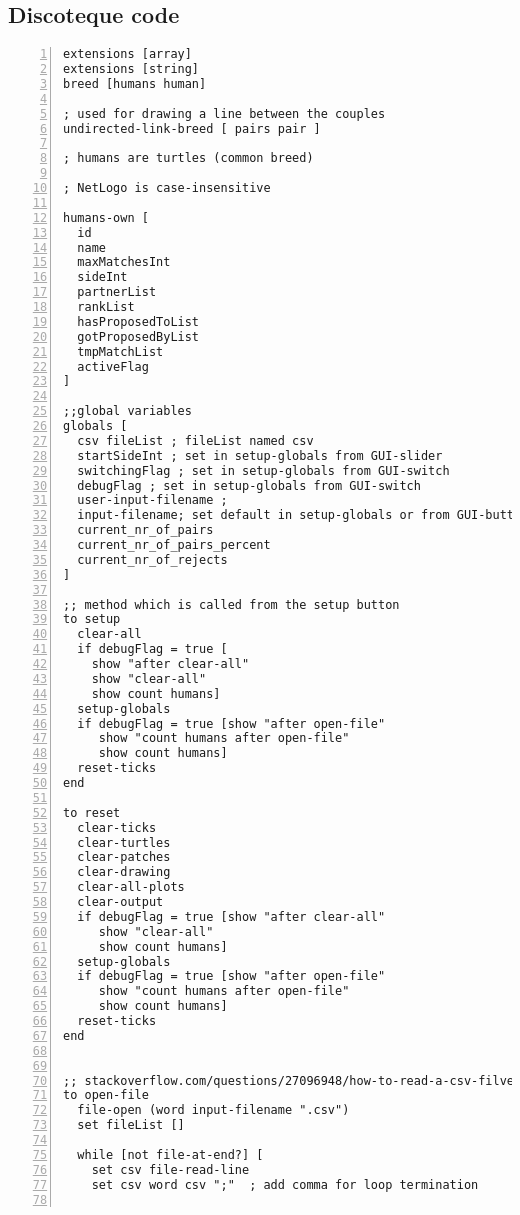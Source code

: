 \label{Appendix}
\subsection{Discoteque code}

\begin{lstlisting}[numbers=left, breaklines=true] 
extensions [array]
extensions [string]
breed [humans human]

; used for drawing a line between the couples
undirected-link-breed [ pairs pair ]

; humans are turtles (common breed)

; NetLogo is case-insensitive

humans-own [
  id
  name
  maxMatchesInt
  sideInt
  partnerList
  rankList
  hasProposedToList
  gotProposedByList
  tmpMatchList
  activeFlag
]

;;global variables
globals [
  csv fileList ; fileList named csv
  startSideInt ; set in setup-globals from GUI-slider
  switchingFlag ; set in setup-globals from GUI-switch
  debugFlag ; set in setup-globals from GUI-switch
  user-input-filename ;
  input-filename; set default in setup-globals or from GUI-button
  current_nr_of_pairs
  current_nr_of_pairs_percent
  current_nr_of_rejects
]

;; method which is called from the setup button
to setup
  clear-all
  if debugFlag = true [
    show "after clear-all"
    show "clear-all"
    show count humans]
  setup-globals
  if debugFlag = true [show "after open-file"
     show "count humans after open-file"
     show count humans]
  reset-ticks
end

to reset
  clear-ticks
  clear-turtles
  clear-patches
  clear-drawing
  clear-all-plots
  clear-output
  if debugFlag = true [show "after clear-all"
     show "clear-all"
     show count humans]
  setup-globals
  if debugFlag = true [show "after open-file"
     show "count humans after open-file"
     show count humans]
  reset-ticks
end


;; stackoverflow.com/questions/27096948/how-to-read-a-csv-filve-with-netlogo
to open-file
  file-open (word input-filename ".csv")
  set fileList []

  while [not file-at-end?] [
    set csv file-read-line
    set csv word csv ";"  ; add comma for loop termination


\end{lstlisting}
